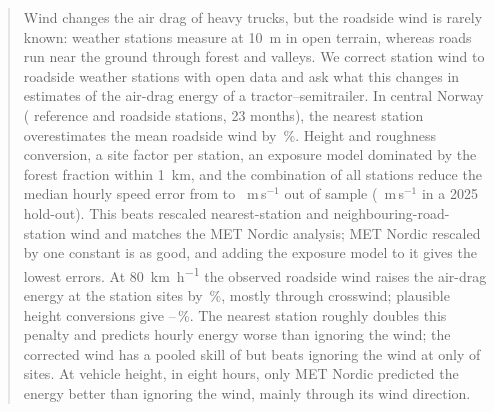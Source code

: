 \begin{abstract}
Wind changes the air drag of heavy trucks, but the roadside wind is rarely known: weather stations measure at \SI{10}{m} in open terrain, whereas roads run near the ground through forest and valleys. We correct station wind to roadside weather stations with open data and ask what this changes in estimates of the air-drag energy of a tractor--semitrailer. In central Norway (\noRef{} reference and \noTrv{} roadside stations, 23 months), the nearest station overestimates the mean roadside wind by \noSpdBiasAbsRaw\,\%. Height and roughness conversion, a site factor per station, an exposure model dominated by the forest fraction within \SI{1}{km}, and the combination of all stations reduce the median hourly speed error from \noCvRaw{} to \noCvMed~m\,s$^{-1}$ out of sample (\noHoldMed~m\,s$^{-1}$ in a 2025 hold-out). This beats rescaled nearest-station and neighbouring-road-station wind and matches the MET Nordic analysis; MET Nordic rescaled by one constant is as good, and adding the exposure model to it gives the lowest errors. At \SI{80}{km.h^{-1}} the observed roadside wind raises the air-drag energy at the station sites by \enAddNo\,\%, mostly through crosswind; plausible height conversions give \enBandNoLo--\enBandNoHi\,\%. The nearest station roughly doubles this penalty and predicts hourly energy worse than ignoring the wind; the corrected wind has a pooled skill of \enSsNoCor{} but beats ignoring the wind at only \enStGainNoCor{} of \enNoStations{} sites. At vehicle height, in eight hours, only MET Nordic predicted the energy better than ignoring the wind, mainly through its wind direction.
\end{abstract}

